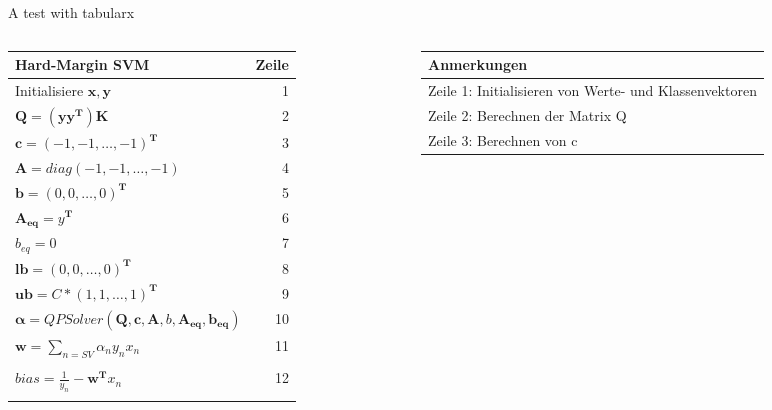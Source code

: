 \documentclass[ngerman]{beamer}
\begin{document}
\begin{frame} {A test with tabularx}
    \begin{columns}[T]
        \begin{column}{0.7\textwidth}
        \begin{tabularx}{1.0\textwidth}{|X r|}
            \hline
            \textbf{Hard-Margin SVM} & \textbf{Zeile} \\
            \hline
            Initialisiere $\mathbf{x}, \mathbf{y}$ & 1\\
            $\mathbf{Q} = (\mathbf{y}\mathbf{y}^{\mathbf{T}})\mathbf{K}$ & 2\\
            $\mathbf{c} = \left( -1, -1, \ldots, -1 \right)^{\mathbf{T}}$ & 3 \\
            $\mathbf{A} = diag\left( -1, -1, \ldots, -1 \right)$ & 4 \\
            $\mathbf{b} = \left( 0, 0, \ldots, 0 \right)^{\mathbf{T}}$ & 5\\
            $\mathbf{A_{eq}} = y^{\mathbf{T}}$ & 6\\
            $b_{eq} = 0$ & 7\\
            $\mathbf{lb} = \left( 0, 0, \ldots, 0 \right)^{\mathbf{T}}$ & 8 \\
            $\mathbf{ub} = C * \left( 1, 1, \ldots, 1 \right)^{\mathbf{T}}$ & 9 \\
            $\mathbf{\alpha} = QPSolver\left( \mathbf{Q}, \mathbf{c}, \mathbf{A}, b, \mathbf{A_{eq}}, \mathbf{b_{eq}} \right)$ & 10\\
            $\mathbf{w} = \sum\limits_{n=SV} \alpha_{n} y_{n} x_{n}$  & 11\\
            & \\[-1em]
            $bias = \frac{1}{y_{n}} - \mathbf{w}^{\mathbf{T}}x_{n}$ & 12\\
            & \\
            \hline
        \end{tabularx}
        \end{column}
        \begin{column}{0.3\textwidth}
        \begin{tabularx}{1.0\textwidth}{|X|}
            \hline
            \textbf{Anmerkungen} \\
            \hline
            Zeile 1: Initialisieren von Werte- und Klassenvektoren\\
            Zeile 2: Berechnen der Matrix Q \\
            Zeile 3: Berechnen von c \\

\end{tabularx}
\end{column}
\end{columns}
\end{frame}
\end{document}
